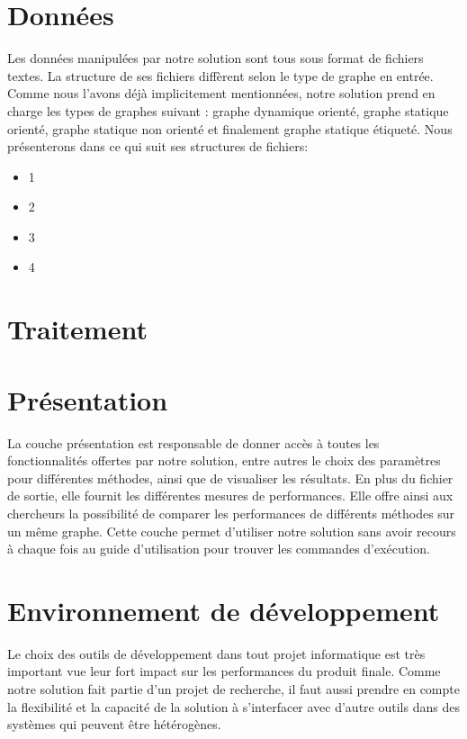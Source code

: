 	
	
	\section{Données}
	Les données manipulées par notre solution sont tous sous format de fichiers textes. La structure de ses fichiers diffèrent selon le type de graphe en entrée. Comme nous l'avons déjà implicitement mentionnées, notre solution prend en charge les types de graphes suivant : graphe dynamique orienté, graphe statique orienté, graphe statique non orienté et finalement graphe statique étiqueté. Nous présenterons dans ce qui suit ses structures de fichiers:
	
	\begin{itemize}[label=$\bullet$]
	\item 1
	\item 2
	\item 3
	\item 4
	
	\end{itemize}
	
	
	
	\section{Traitement}
	\section{Présentation}
	
	La couche présentation est responsable de donner accès à toutes les fonctionnalités offertes par notre solution, entre autres le choix des paramètres pour différentes méthodes, ainsi que de visualiser les résultats. En plus du fichier de sortie, elle fournit les différentes mesures de performances. Elle offre ainsi aux chercheurs la possibilité de comparer les performances de différents méthodes sur un même graphe. Cette couche permet d'utiliser notre solution sans avoir recours à chaque fois au guide d'utilisation pour trouver les commandes d'exécution.
	
	\section{Environnement de développement}
		
		Le choix des outils de développement dans tout projet informatique est très important vue leur fort impact sur les performances du produit finale. Comme notre solution fait partie d'un projet de recherche, il faut aussi prendre en compte la flexibilité et la capacité de la solution à s'interfacer avec d'autre outils dans des systèmes qui peuvent être hétérogènes. 
		

